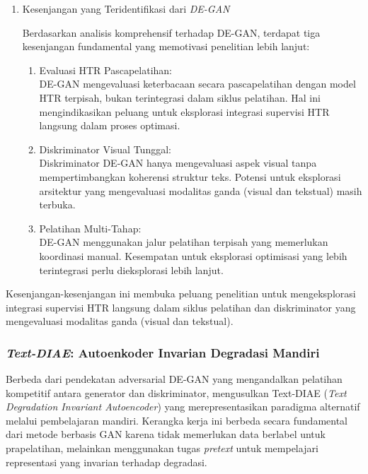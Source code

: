 \documentclass[12pt,a4paper]{article}
\begin{document}
\begin{enumerate}[leftmargin=*, labelindent=0pt, itemsep=1ex, topsep=0pt]
\item Kesenjangan yang Teridentifikasi dari \textit{DE-GAN}

Berdasarkan analisis komprehensif terhadap DE-GAN, terdapat tiga kesenjangan fundamental yang memotivasi penelitian lebih lanjut:

\begin{enumerate}[leftmargin=1.5em, labelsep=0.5em, itemindent=0pt, label=\alph*., topsep=0pt, parsep=0pt, itemsep=0pt]
      \item Evaluasi HTR Pascapelatihan: \mbox{}\\[0.1em]
            DE-GAN mengevaluasi keterbacaan secara pascapelatihan dengan model HTR terpisah, bukan terintegrasi dalam siklus pelatihan. Hal ini mengindikasikan peluang untuk eksplorasi integrasi supervisi HTR langsung dalam proses optimasi.

      \item Diskriminator Visual Tunggal: \mbox{}\\[0.1em]
            Diskriminator DE-GAN hanya mengevaluasi aspek visual tanpa mempertimbangkan koherensi struktur teks. Potensi untuk eksplorasi arsitektur yang mengevaluasi modalitas ganda (visual dan tekstual) masih terbuka.

      \item Pelatihan Multi-Tahap: \mbox{}\\[0.1em]
            DE-GAN menggunakan jalur pelatihan terpisah yang memerlukan koordinasi manual. Kesempatan untuk eksplorasi optimisasi yang lebih terintegrasi perlu dieksplorasi lebih lanjut.
\end{enumerate}

\end{enumerate}

Kesenjangan-kesenjangan ini membuka peluang penelitian untuk mengeksplorasi integrasi supervisi HTR langsung dalam siklus pelatihan dan diskriminator yang mengevaluasi modalitas ganda (visual dan tekstual).

\subsubsection{\textit{Text-DIAE}: Autoenkoder Invarian Degradasi Mandiri}
\label{subsubsec:text-diae}

Berbeda dari pendekatan adversarial DE-GAN yang mengandalkan pelatihan kompetitif antara generator dan diskriminator, \parencite{textdiae2022} mengusulkan Text-DIAE (\textit{Text Degradation Invariant Autoencoder}) yang merepresentasikan paradigma alternatif melalui pembelajaran mandiri. Kerangka kerja ini berbeda secara fundamental dari metode berbasis GAN karena tidak memerlukan data berlabel untuk prapelatihan, melainkan menggunakan tugas \textit{pretext} untuk mempelajari representasi yang invarian terhadap degradasi.
\end{document}

